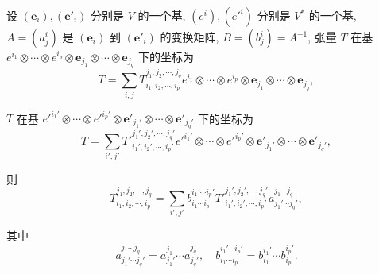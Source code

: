 \documentclass[color=black,device=normal,lang=cn,mode=geye]{elegantnote}
\begin{document}
\begin{theorem}[书上的定理 2]
    设 $(\boldsymbol{e}_i),(\boldsymbol{e}'_i)$ 分别是 $V$ 的一个基, $(e^i),(e'^i)$ 分别是 $V^*$ 的一个基, $A=(a^i_j)$ 是 $(\boldsymbol{e}_i)$ 到 $(\boldsymbol{e}'_i)$ 的变换矩阵, $B=(b^i_j)=A^{-1}$, 张量 $T$ 在基 $e^{i_1}\otimes\cdots\otimes e^{i_p}\otimes\boldsymbol{e}_{j_1}\otimes\cdots\otimes\boldsymbol{e}_{j_q}$ 下的坐标为
    \[T=\sum\limits_{i,j}T^{j_1,j_2,\cdots,j_q}_{i_1,i_2,\cdots,i_p}e^{i_1}\otimes\cdots\otimes e^{i_p}\otimes\boldsymbol{e}_{j_1}\otimes\cdots\otimes\boldsymbol{e}_{j_q},\]


    $T$ 在基 $e'^{i_1'}\otimes\cdots\otimes e'^{i_p'}\otimes\boldsymbol{e}'_{j_1'}\otimes\cdots\otimes\boldsymbol{e}'_{j_q'}$ 下的坐标为
    \begin{equation}\label{eq1.1}
        T=\sum\limits_{i',j'}T'^{j_1',j_2',\cdots,j_q'}_{i_1',i_2',\cdots,i_p'}e'^{i_1'}\otimes\cdots\otimes e'^{i_p'}\otimes\boldsymbol{e}'_{j_1'}\otimes\cdots\otimes\boldsymbol{e}'_{j_q'},
    \end{equation}

    则
    \[T^{j_1,j_2,\cdots,j_q}_{i_1,i_2,\cdots,i_p}=\sum\limits_{i',j'}b^{i_1'\cdots i_p'}_{i_1\cdots i_p}T'^{j_1',j_2',\cdots,j_q'}_{i_1',i_2',\cdots,i_p'}a^{j_1\cdots j_q}_{j_1'\cdots j_q'},\]

    其中
    \[a^{j_1\cdots j_q}_{j_1'\cdots j_q'}=a^{j_1}_{j_1'}\cdots a^{j_q}_{j_q'},\quad b^{i_1'\cdots i_p'}_{i_1\cdots i_p}=b^{i_1'}_{i_1}\cdots b^{i_p'}_{i_p}.\]
\end{theorem}
\end{document}
